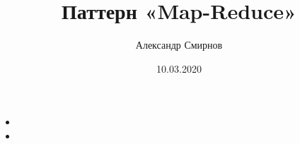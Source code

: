 \documentclass[xetex,mathserif,serif]{beamer}
\title{Паттерн «Map-Reduce»}
\author[Александр Смирнов]{Александр Смирнов}
\date{10.03.2020}
\begin{document}
\begin{frame}
	\titlepage
\end{frame}


\begin{frame}

	\frametitle{}


	\begin{itemize}
		\item 
		\item 
	\end{itemize}

\end{frame}
\end{document}
